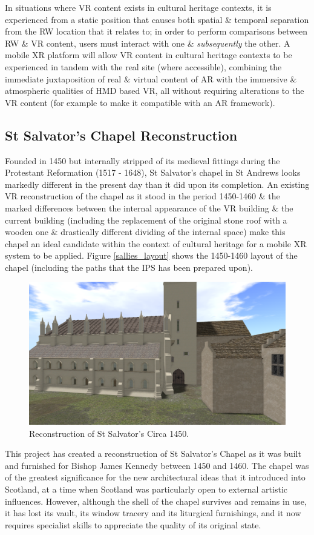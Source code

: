 \documentclass[conference]{acmsiggraph}
\begin{document}
In situations where VR content exists in cultural heritage contexts, it is experienced from a static position that causes both spatial \& temporal separation from the RW location that it relates to; in order to perform comparisons between RW \& VR content, users must interact with one \& \textit{subsequently} the other. A mobile XR platform will allow VR content in cultural heritage contexts to be experienced in tandem with the real site (where accessible), combining the immediate juxtaposition of real \& virtual content of AR with the immersive \& atmospheric qualities of HMD based VR, all without requiring alterations to the VR content (for example to make it compatible with an AR framework).

\subsection{St Salvator's Chapel Reconstruction}
Founded in 1450 but internally stripped of its medieval fittings during the Protestant Reformation (1517 - 1648), St Salvator's chapel in St Andrews looks markedly different in the present day than it did upon its completion. An existing VR reconstruction of the chapel as it stood in the period 1450-1460 \& the marked differences between the internal appearance of the VR building \& the current building (including the replacement of the original stone roof with a wooden one \& drastically different dividing of the internal space) make this chapel an ideal candidate within the context of cultural heritage for a mobile XR system to be applied. Figure \ref{sallies_layout} shows the 1450-1460 layout of the chapel (including the paths that the IPS has been prepared upon).


\begin{figure}[!t]
	\centering
	\includegraphics[width=.5\textwidth]{images/sallyold.png}
	\caption{Reconstruction of St Salvator's Circa 1450.}
	\label{community}
	\vspace{-20 pt}
\end{figure}

This project has created a reconstruction of St Salvator’s Chapel as it was built and furnished for Bishop James Kennedy between 1450 and 1460. The chapel was of the greatest significance for the new architectural ideas that it introduced into Scotland, at a time when Scotland was particularly open to external artistic influences. However, although the shell of the chapel survives and remains in use, it has lost its vault, its window tracery and its liturgical furnishings, and it now requires specialist skills to appreciate the quality of its original state. 
\end{document}

